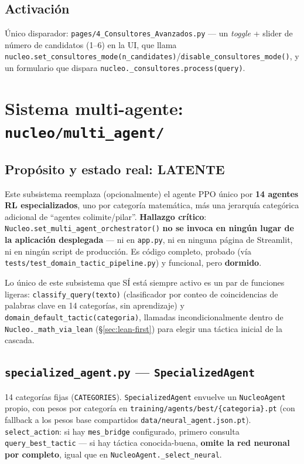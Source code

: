 \documentclass[11pt,a4paper]{report}
\newcommand{\code}[1]{\texttt{#1}}
\newcommand{\inerte}[1]{\textcolor{bad}{\textbf{#1}}}
\begin{document}
\section{Activaci\'on}

\'Unico disparador: \code{pages/4_Consultores_Avanzados.py} --- un \emph{toggle} + slider de n\'umero de candidatos (1--6) en la UI, que llama \code{nucleo.set_consultores_mode(n\_candidates)}/\code{disable\_consultores_mode()}, y un formulario que dispara \code{nucleo.\_consultores.process(query)}.

\chapter{Sistema multi-agente: \code{nucleo/multi_agent/}}
\label{ch:multiagent}

\section{Prop\'osito y estado real: \inerte{LATENTE}}

Este subsistema reemplaza (opcionalmente) el agente PPO \'unico por \textbf{14 agentes RL especializados}, uno por categor\'ia matem\'atica, m\'as una jerarqu\'ia categ\'orica adicional de ``agentes colimite/pilar''. \textbf{Hallazgo cr\'itico}: \code{Nucleo.set_multi_agent_orchestrator()} \textbf{no se invoca en ning\'un lugar de la aplicaci\'on desplegada} --- ni en \code{app.py}, ni en ninguna p\'agina de Streamlit, ni en ning\'un script de producci\'on. Es c\'odigo completo, probado (v\'ia \code{tests/test\_domain\_tactic\_pipeline.py}) y funcional, pero \textbf{dormido}.

Lo \'unico de este subsistema que S\'I est\'a siempre activo es un par de funciones ligeras: \code{classify_query(texto)} (clasificador por conteo de coincidencias de palabras clave en 14 categor\'ias, sin aprendizaje) y \code{domain_default_tactic(categoria)}, llamadas incondicionalmente dentro de \code{Nucleo.\_math_via_lean} (\S\ref{sec:lean-first}) para elegir una t\'actica inicial de la cascada.

\section{\code{specialized_agent.py} --- \code{SpecializedAgent}}

14 categor\'ias fijas (\code{CATEGORIES}). \code{SpecializedAgent} envuelve un \code{NucleoAgent} propio, con pesos por categor\'ia en \code{training/agents/best/\{categoria\}.pt} (con fallback a los pesos base compartidos \code{data/neural\_agent.json.pt}). \code{select_action}: si hay \code{mes\_bridge} configurado, primero consulta \code{query_best_tactic} --- si hay t\'actica conocida-buena, \textbf{omite la red neuronal por completo}, igual que en \code{NucleoAgent.\_select_neural}.
\end{document}
